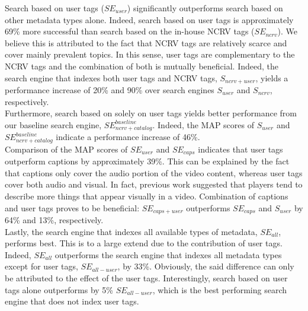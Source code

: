 Search based on user tags ($SE_{user}$) significantly outperforms search based on other metadata types alone. Indeed, search based on user tags is approximately 69\% more successful than search based on the in-house NCRV tags ($SE_{ncrv}$). We believe this is attributed to the fact that NCRV tags are relatively scarce and cover mainly prevalent topics. In this sense, user tags are complementary to the NCRV tags and the combination of both is mutually beneficial. Indeed, the search engine that indexes both user tags and NCRV tags, $S_{ncrv+user}$, yields a performance increase of 20\% and 90\% over search engines $S_{user}$ and $S_{ncrv}$, respectively.\\
Furthermore, search based on solely on user tags yields better performance from our baseline search engine, $SE_{ncrv+catalog}^{baseline}$. Indeed, the MAP scores of $S_{user}$ and $SE_{ncrv+catalog}^{baseline}$ indicate a performance increase of 46\%.\\
Comparison of the MAP scores of $SE_{user}$ and $SE_{caps}$ indicates that user tags outperform captions by approximately 39\%. This can be explained by the fact that captions only cover the audio portion of the video content, whereas user tags cover both audio and visual. In fact, previous work \cite{kcap} suggested that players tend to describe more things that appear visually in a video. Combination of captions and user tags proves to be beneficial: $SE_{caps+user}$ outperforms $SE_{caps}$ and $S_{user}$ by 64\% and 13\%, respectively.\\
Lastly, the search engine that indexes all available types of metadata, $SE_{all}$, performs best. This is to a large extend due to the contribution of user tags. Indeed, $SE_{all}$ outperforms the search engine that indexes all metadata types except for user tags, $SE_{all-user}$, by 33\%. Obviously, the said difference can only be attributed to the effect of the user tags. Interestingly, search based on user tags alone outperforms by 5\%  $SE_{all-user}$, which is the best performing search engine that does not index user tags.

